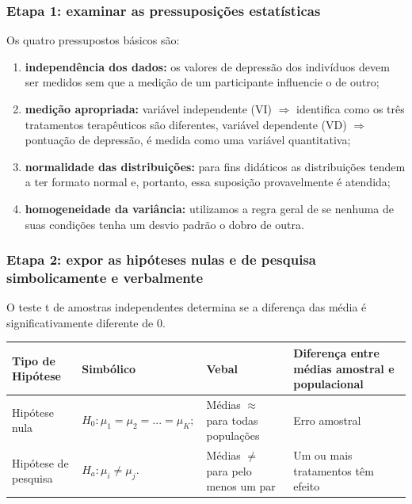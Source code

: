\documentclass[11pt]{beamer}
\begin{document}
\begin{frame}
\frametitle{Etapa 1: examinar as pressuposições estatísticas}

Os quatro pressupostos básicos são:

\begin{enumerate}
\item \textbf{independência dos dados:} os valores de depressão dos indivíduos devem ser medidos sem que a medição de um participante influencie o de outro;
\item \textbf{medição apropriada:} variável independente (VI) \(\Rightarrow\) identifica como os três tratamentos terapêuticos são diferentes, variável dependente (VD) \(\Rightarrow\) pontuação de depressão, é medida como uma variável quantitativa;
\item \textbf{normalidade das distribuições:}  para fins didáticos as distribuições tendem a ter formato normal e, portanto, essa suposição provavelmente é atendida;
\item \textbf{homogeneidade da variância:} utilizamos a regra geral de se nenhuma de suas condições tenha um desvio padrão o dobro de outra.
\end{enumerate}

\end{frame}

\begin{frame}
\frametitle{Etapa 2: expor as hipóteses nulas e de pesquisa simbolicamente e verbalmente}

O teste t de amostras independentes determina se a diferença das média é significativamente diferente de 0.

\begin{center}
\begin{tabular}{ m{2cm}|m{3cm}|m{2cm}|m{3cm} } 
 \hline
 Tipo de Hipótese & Simbólico & Vebal & Diferença entre médias amostral e populacional\\
  \hline
 Hipótese nula & $H_0:\mu_1=\mu_2=...=\mu_K;$ & Médias $\approx$ para todas populações & Erro amostral \\
 Hipótese de pesquisa & $H_a:\mu_i \neq \mu_j.$ & Médias $\neq$ para pelo menos um par & Um ou mais tratamentos têm efeito  \\ 
 \hline
 \hline
\end{tabular}
\end{center}

\end{frame}
\end{document}
